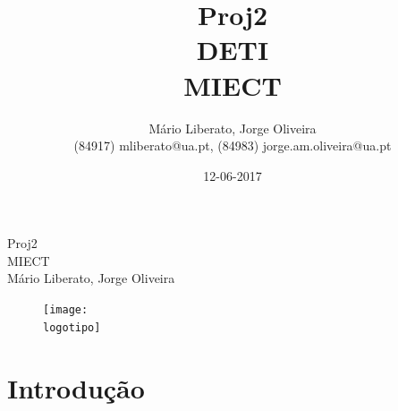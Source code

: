 \documentclass{report}
\begin{document}
%
%
\def\titulo{Proj2}
\def\data{12-06-2017}
\def\autores{Mário Liberato, Jorge Oliveira}
\def\autorescontactos{(84917) mliberato@ua.pt, (84983) jorge.am.oliveira@ua.pt}
\def\departamento{DETI}
\def\curso{MIECT}
\def\logotipo{ua.pdf}
%
%
\begin{titlepage}

\begin{center}
%
\vspace*{50mm}
%
{\Huge \titulo}\\ 
%
\vspace{10mm}
%
{\Large \curso}\\
%
\vspace{10mm}
%
{\LARGE \autores}\\ 
%
\vspace{30mm}
%
\begin{figure}[h]
\center
\texttt{[image: \\logotipo]}
\end{figure}
%
\vspace{30mm}
\end{center}
%
\end{titlepage}

\title{%
{\Huge\textbf{\titulo}}\\
{\Large \departamento\\ \curso}
}
%
\author{%
    \autores \\
    \autorescontactos
}
%
\date{\data}
%
\maketitle


\begin{abstract}

\end{abstract}


\tableofcontents


%
\clearpage
{} %
%
\chapter{Introdução}
\label{chap.introducao} 
\end{document}
